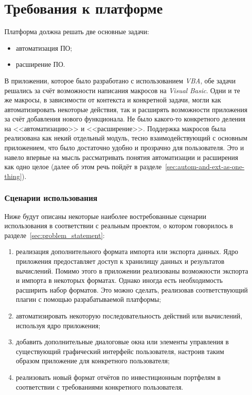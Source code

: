 \section{Требования к платформе}
\label{sec:pl_requirements}

Платформа должна решать две основные задачи:
\begin{itemize}
 \item автоматизация ПО;
 \item расширение ПО.
\end{itemize}

В приложении, которое было разработано с использованием {\it VBA}, обе задачи решались за счёт возможности написания макросов на {\it Visual Basic}. Одни и те же макросы, в зависимости от контекста и конкретной задачи, могли как автоматизировать некоторые действия, так и расширять возможности приложения за счёт добавления нового функционала. Не было какого-то конкретного деления на <<автоматизацию>> и <<расширение>>. Поддержка макросов была реализована как некий отдельный модуль, тесно взаимодействующий с основным приложением, что было достаточно удобно и прозрачно для пользователя. Это и навело впервые на мысль рассматривать понятия автоматизации и расширения как одно целое (далее об этом речь пойдёт в разделе~\ref{sec:autom-and-ext-as-one-thing}).

\subsubsection{Сценарии использования}
Ниже будут описаны некоторые наиболее востребованные сценарии использования в соответствии с реальным проектом, о котором говорилось в разделе~\ref{sec:problem_statement}:
\begin{enumerate}
 \item реализация дополнительного формата импорта или экспорта данных. Ядро приложения предоставляет доступ к хранилищу данных и результатов вычислений. Помимо этого в приложении реализованы возможности экспорта и импорта в некоторых форматах. Однако иногда есть необходимость расширить набор форматов. Это можно сделать, реализовав соответствующий плагин с помощью разрабатываемой платформы;
 \item автоматизировать некоторую последовательность действий или вычислений, используя ядро приложения;
 \item добавить дополнительные диалоговые окна или элементы управления в существующий графический интерфейс пользователя, настроив таким образом приложение для конкретного пользователя;
 \item реализовать новый формат отчётов по инвестиционным портфелям в соответствии с требованиями конкретного пользователя.
\end{enumerate}


